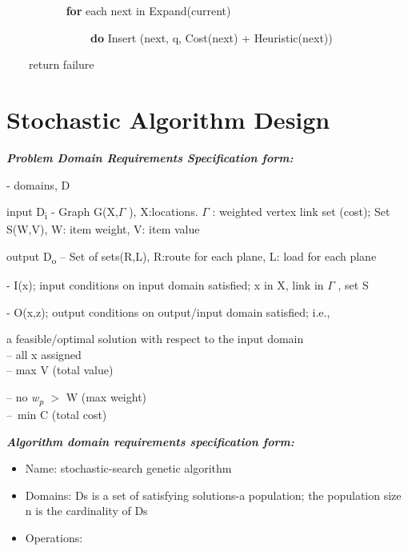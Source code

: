 \documentclass[journal]{IEEEtran}
\begin{document}
\ \ \ \ \ \ \ \ \ \  \textbf{ for} each next in Expand(current)\par

\ \ \ \ \ \ \ \ \ \ \ \ \ \ \  \textbf{do} Insert (next, q, Cost(next) + Heuristic(next))\par

\ \ \ \  return failure\par


\section{Stochastic Algorithm Design}
\setlength{\parskip}{18.12pt}
\textbf{\textit{Problem Domain Requirements Specification form:}}
\par

\setlength{\parskip}{8.04pt}
- domains, D \par

\tab input D\textsubscript{i }- Graph G(X,$ \Gamma $ ), X:locations. $ \Gamma $ : weighted vertex link set (cost); Set S(W,V), W: item weight, V: item value\par

\tab output D\textsubscript{o }– Set of sets(R,L), R:route for each plane, L: load for each plane\par

- I(x); input conditions on input domain satisﬁed; x in X, link in $ \Gamma $ , set S \par

- O(x,z); output conditions on output/input domain satisﬁed; i.e., \par

\setlength{\parskip}{18.12pt}

\tab a feasible/optimal solution with respect to the input domain \\
-- all x assigned\\
-- max V (total value)\par

-- no \textit{w\textsubscript{p} $>$ }W (max weight)\\
--\ min C (total cost)  \par

\vspace{\baselineskip}
\setlength{\parskip}{8.04pt}
\textbf{\textit{Algorithm domain requirements specification form:}}\par

\begin{itemize}
	\item Name: stochastic-search genetic algorithm\par

	\item Domains: Ds is a set of satisfying solutions-a population; the population size n is the cardinality of Ds\par

	\item Operations:
\end{itemize}\par
\end{document}

